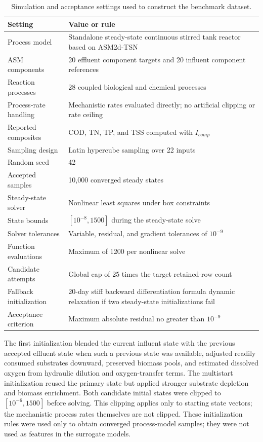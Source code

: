 \documentclass[a4paper,fleqn]{cas-sc}
\begin{document}
\begin{table}[htbp]
\centering
\caption{Simulation and acceptance settings used to construct the benchmark dataset.}
\label{tab:simulation_settings}
\scriptsize
\begin{tabular}{p{3.7cm}p{7.2cm}}
\hline
Setting & Value or rule \\
\hline
Process model & Standalone steady-state continuous stirred tank reactor based on ASM2d-TSN \\
ASM components & 20 effluent component targets and 20 influent component references \\
Reaction processes & 28 coupled biological and chemical processes \\
Process-rate handling & Mechanistic rates evaluated directly; no artificial clipping or rate ceiling \\
Reported composites & COD, TN, TP, and TSS computed with $I_{comp}$ \\
Sampling design & Latin hypercube sampling over 22 inputs \\
Random seed & 42 \\
Accepted samples & 10,000 converged steady states \\
Steady-state solver & Nonlinear least squares under box constraints \\
State bounds & $[10^{-8},1500]$ during the steady-state solve \\
Solver tolerances & Variable, residual, and gradient tolerances of $10^{-9}$ \\
Function evaluations & Maximum of 1200 per nonlinear solve \\
Candidate attempts & Global cap of 25 times the target retained-row count \\
Fallback initialization & 20-day stiff backward differentiation formula dynamic relaxation if two steady-state initializations fail \\
Acceptance criterion & Maximum absolute residual no greater than $10^{-9}$ \\
\hline
\end{tabular}
\end{table}

The first initialization blended the current influent state with the previous accepted effluent state when such a previous state was available, adjusted readily consumed substrates downward, preserved biomass pools, and estimated dissolved oxygen from hydraulic dilution and oxygen-transfer terms. The multistart initialization reused the primary state but applied stronger substrate depletion and biomass enrichment. Both candidate initial states were clipped to $[10^{-6},1500]$ before solving. This clipping applies only to starting state vectors; the mechanistic process rates themselves are not clipped. These initialization rules were used only to obtain converged process-model samples; they were not used as features in the surrogate models.
\end{document}
